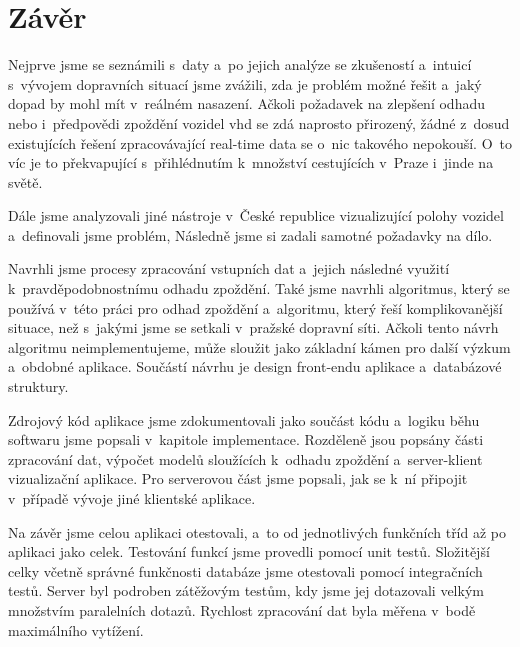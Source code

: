 \chapter*{Závěr}


Nejprve jsme se seznámili s~daty a~po jejich analýze se zkušeností a~intuicí s~vývojem dopravních situací jsme zvážili, zda je problém možné řešit a~jaký dopad by mohl mít v~reálném nasazení. Ačkoli požadavek na zlepšení odhadu nebo i~předpovědi zpoždění vozidel \gls{vhd} se zdá naprosto přirozený, žádné z~dosud existujících řešení zpracovávající real-time data se o~nic takového nepokouší. O~to víc je to překvapující s~přihlédnutím k~množství cestujících v~Praze i~jinde na světě.


\bigbreak

Dále jsme analyzovali jiné nástroje v~České republice vizualizující polohy vozidel a~definovali jsme problém, Následně jsme si zadali samotné požadavky na dílo.

\bigbreak

Navrhli jsme procesy zpracování vstupních dat a~jejich následné využití k~pravděpodobnostnímu odhadu zpoždění. Také jsme navrhli algoritmus, který se používá v~této práci pro odhad zpoždění a~algoritmu, který řeší komplikovanější situace, než s~jakými jsme se setkali v~pražské dopravní síti. Ačkoli tento návrh algoritmu neimplementujeme, může sloužit jako základní kámen pro další výzkum a~obdobné aplikace. Součástí návrhu je design front-endu aplikace a~databázové struktury.


\bigbreak

Zdrojový kód aplikace jsme zdokumentovali jako součást kódu a~logiku běhu softwaru jsme popsali v~kapitole implementace. Rozděleně jsou popsány části zpracování dat, výpočet modelů sloužících k~odhadu zpoždění a~server-klient vizualizační aplikace. Pro serverovou část jsme popsali, jak se k~ní připojit v~případě vývoje jiné klientské aplikace.


\bigbreak

Na závěr jsme celou aplikaci otestovali, a~to od jednotlivých funkčních tříd až po aplikaci jako celek. Testování funkcí jsme provedli pomocí unit testů. Složitější celky včetně správné funkčnosti databáze jsme otestovali pomocí integračních testů. Server byl podroben zátěžovým testům, kdy jsme jej dotazovali velkým množstvím paralelních dotazů. Rychlost zpracování dat byla měřena v~bodě maximálního vytížení.


\bigbreak

